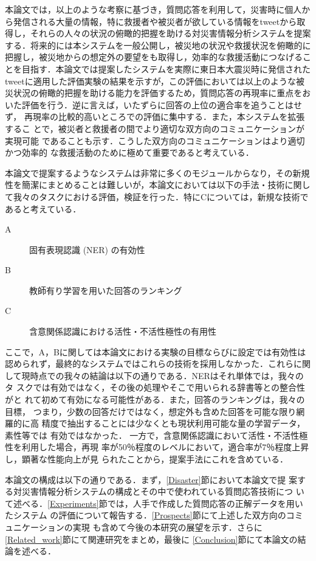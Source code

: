 \documentclass[japanese]{jnlp_1.4}
\begin{document}
本論文では，以上のような考察に基づき，質問応答を利用して，災害時に個人か
ら発信される大量の情報，特に救援者や被災者が欲している情報をtweetから取
得し，それらの人々の状況の俯瞰的把握を助ける対災害情報分析システムを提案
する．将来的には本システムを一般公開し，被災地の状況や救援状況を俯瞰的に
把握し，被災地からの想定外の要望をも取得し，効率的な救援活動につなげるこ
とを目指す．本論文では提案したシステムを実際に東日本大震災時に発信された
tweetに適用した評価実験の結果を示すが，この評価においては以上のような被
災状況の俯瞰的把握を助ける能力を評価するため，質問応答の再現率に重点をお
いた評価を行う．逆に言えば，いたずらに回答の上位の適合率を追うことはせず，
再現率の比較的高いところでの評価に集中する．また，本システムを拡張するこ
とで，被災者と救援者の間でより適切な双方向のコミュニケーションが実現可能
であることも示す．こうした双方向のコミュニケーションはより適切かつ効率的
な救援活動のために極めて重要であると考えている．

本論文で提案するようなシステムは非常に多くのモジュールからなり，その新規
性を簡潔にまとめることは難しいが，本論文においては以下の手法・技術に関し
て我々のタスクにおける評価，検証を行った．特にCについては，新規な技術で
あると考えている．
\begin{description}
 \item[A] 固有表現認識 (NER) の有効性
 \item[B] 教師有り学習を用いた回答のランキング
 \item[C] 含意関係認識における活性・不活性極性\cite{Hashimoto2012}の有用性
\end{description}

ここで，A，Bに関しては本論文における実験の目標ならびに設定では有効性は
認められず，最終的なシステムではこれらの技術を採用しなかった．これらに関
して現時点での我々の結論は以下の通りである．NERはそれ単体では，我々のタ
スクでは有効ではなく，その後の処理やそこで用いられる辞書等との整合性がと
れて初めて有効になる可能性がある．また，回答のランキングは，我々の目標，
つまり，少数の回答だけではなく，想定外も含めた回答を可能な限り網羅的に高
精度で抽出することには少なくとも現状利用可能な量の学習データ，素性等では
有効ではなかった．
一方で，含意関係認識において活性・不活性極性を利用した場合，再現
率が50％程度のレベルにおいて，適合率が7％程度上昇し，顕著な性能向上が見
られたことから，提案手法にこれを含めている．

本論文の構成は以下の通りである．まず，\ref{Disaster}節において本論文で提
案する対災害情報分析システムの構成とその中で使われている質問応答技術につ
いて述べる．\ref{Experiments}節では，人手で作成した質問応答の正解データを用いたシステム
の評価について報告する．\ref{Prospects}節にて上述した双方向のコミュニケーションの実現
も含めて今後の本研究の展望を示す．さらに\ref{Related_work}節にて関連研究をまとめ，最後に
\ref{Conclusion}節にて本論文の結論を述べる．
\end{document}
